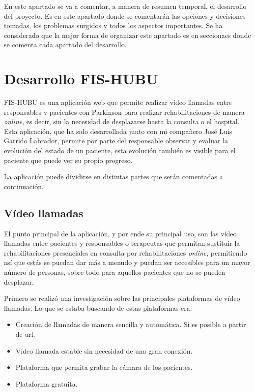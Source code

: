 
En este apartado se va a comentar, a manera de resumen temporal, el desarrollo del proyecto. Es en este apartado donde se comentarán las opciones y decisiones tomadas, los problemas surgidos y todos los aspectos importantes. Se ha considerado que la mejor forma de organizar este apartado es en seccionaes donde se comenta cada apartado del desarrollo.

\section{Desarrollo FIS-HUBU}\label{desarrolloFH}
FIS-HUBU es una aplicación web que permite realizar vídeo llamadas entre responsables y pacientes con Parkinson para realizar rehabilitaciones de manera \textit{online}, es decir, sin la necesidad de desplazarse hasta la consulta o el hospital. Esta aplicación, que ha sido desarrollada junto con mi compañero José Luis Garrido Labrador, permite por parte del responsable observar y evaluar la evolución del estado de un paciente, esta evolución también es visible para el paciente que puede ver su propio progreso.

La aplicación puede dividirse en distintas partes que serán comentadas a continuación.
\subsection{Vídeo llamadas}
El punto principal de la aplicación, y por ende su principal uso, son las vídeo llamadas entre pacientes y responsables o terapeutas que permitan sustituir la rehabilitaciones presenciales en consulta por rehabilitaciones \textit{online}, permitiendo así que estás se puedan dar más a menudo y puedan ser accesibles para un mayor número de personas, sobre todo para aquellos pacientes que no se pueden desplazar.

Primero se realizó una investigación sobre las principales plataformas de vídeo llamadas. Lo que se estaba buscando de estas plataformas era:
\begin{itemize}
	\item Creación de llamadas de manera sencilla y automática. Si es posible a partir de url.
	\item Vídeo llamada estable sin necesidad de una gran conexión.
	\item Plataforma que permita grabar la cámara de los pacientes.
	\item Plataforma gratuita.
\end{itemize}

